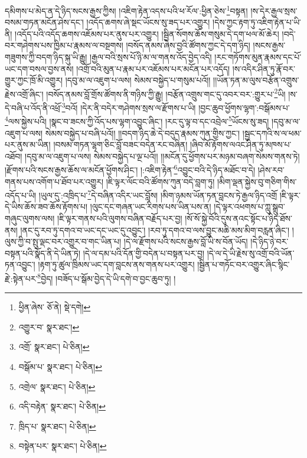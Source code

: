 དམིགས་པ་མེད་ན་དེ་ཉིད་སངས་རྒྱས་ཀྱིས། །འཇིག་རྟེན་འདས་པའི་ཕ་རོལ་:ཕྱིན་ཅེས་\footnote{ཕྱིན་ཞེས་  ཅོ་ནེ།  སྡེ་དགེ། }བསྟན། །ས་དེར་རྒྱལ་སྲས་བསམ་གཏན་མངོན་ཤེས་དང་། །འདོད་ཆགས་ཞེ་སྡང་ཡོངས་སུ་ཟད་པར་འགྱུར། །དེས་ཀྱང་རྟག་ཏུ་འཇིག་རྟེན་པ་ཡི་ནི། །འདོད་པའི་འདོད་ཆགས་འཇོམས་པར་ནུས་པར་འགྱུར། །སྦྱིན་སོགས་ཆོས་གསུམ་དེ་དག་ཕལ་མོ་ཆེར། །བདེ་བར་གཤེགས་པས་ཁྱིམ་པ་རྣམས་ལ་བསྔགས། །བསོད་ནམས་ཞེས་བྱའི་ཚོགས་ཀྱང་དེ་དག་ཉིད། །སངས་རྒྱས་གཟུགས་ཀྱི་བདག་ཉིད་སྐུ་ཡི་རྒྱུ། །རྒྱལ་བའི་སྲས་པོ་ཉི་མ་ལ་གནས་འོད་བྱེད་འདི། །རང་གཏོགས་མུན་རྣམས་དང་པོ་ཡང་དག་བསལ་བྱས་ནས། །འགྲོ་བའི་མུན་པ་རྣམ་པར་འཇོམས་པར་མངོན་པར་འདོད། །ས་འདིར་ཤིན་ཏུ་རྣོ་བར་གྱུར་ཀྱང་ཁྲོ་མི་འགྱུར། །དབུ་མ་ལ་འཇུག་པ་ལས། སེམས་བསྐྱེད་པ་གསུམ་པའོ།། །།ཡོན་ཏན་མ་ལུས་བརྩོན་འགྲུས་རྗེས་འགྲོ་ཞིང་། །བསོད་ནམས་བློ་གྲོས་ཚོགས་ནི་གཉིས་ཀྱི་རྒྱུ། །བརྩོན་འགྲུས་གང་དུ་འབར་བར་:གྱུར་པ་\footnote{འགྱུར་བ་  སྣར་ཐང་། }ཡི། །ས་དེ་བཞི་པ་འོད་ནི་འཕྲོ་\footnote{འགྲོ་  སྣར་ཐང་།  པེ་ཅིན། }བའོ། །དེར་ནི་བདེར་གཤེགས་སྲས་ལ་རྫོགས་པ་ཡི། །བྱང་ཆུབ་ཕྱོགས་ལྷག་:བསྒོམས་པ་\footnote{བསྒོམ་པ་  སྣར་ཐང་།  པེ་ཅིན། }ལས་སྐྱེས་པའི། །སྣང་བ་ཟངས་ཀྱི་འོད་པས་ལྷག་འབྱུང་ཞིང་། །རང་དུ་ལྟ་བ་དང་འབྲེལ་\footnote{འགྲེལ་  སྣར་ཐང་།  པེ་ཅིན། }ཡོངས་སུ་ཟད། །དབུ་མ་ལ་འཇུག་པ་ལས། སེམས་བསྐྱེད་པ་བཞི་པའོ།། །།བདག་ཉིད་ཆེ་དེ་བདུད་རྣམས་ཀུན་གྱིས་ཀྱང་། །སྦྱང་དཀའི་ས་ལ་ཕམ་པར་ནུས་མ་ཡིན། །བསམ་གཏན་ལྷག་ཅིང་བློ་བཟང་བདེན་རང་བཞིན། །ཞིབ་མོ་རྟོགས་ལའང་ཤིན་ཏུ་མཁས་པ་འཐོབ། །དབུ་མ་ལ་འཇུག་པ་ལས། སེམས་བསྐྱེད་པ་ལྔ་པའོ།། །།མངོན་དུ་ཕྱོགས་པར་མཉམ་བཞག་སེམས་གནས་ཏེ། །རྫོགས་པའི་སངས་རྒྱས་ཆོས་ལ་མངོན་ཕྱོགས་ཤིང་། །:འཇིག་རྟེན་\footnote{འདི་བརྟེན་  སྣར་ཐང་།  པེ་ཅིན། }འབྱུང་བའི་དེ་ཉིད་མཐོང་བ་དེ། །ཤེས་རབ་གནས་པས་འགོག་པ་ཐོབ་པར་འགྱུར། །ཇི་ལྟར་ལོང་བའི་ཚོགས་ཀུན་བདེ་བླག་ཏུ། །མིག་ལྡན་སྐྱེས་བུ་གཅིག་གིས་འདོད་པ་ཡི། །ཡུལ་དུ་:འཁྲིད་པ་\footnote{ཁྲིད་པ་  སྣར་ཐང་།  པེ་ཅིན། }དེ་བཞིན་འདིར་ཡང་བློས། །མིག་ཉམས་ཡོན་ཏན་བླངས་ཏེ་རྒྱལ་ཉིད་འགྲོ །ཇི་ལྟར་དེ་ཡིས་ཆོས་ཟབ་ཆོས་རྟོགས་པ། །ལུང་དང་གཞན་ཡང་རིགས་པས་ཡིན་པས་ན། །དེ་ལྟར་འཕགས་པ་ཀླུ་སྒྲུབ་གཞུང་ལུགས་ལས། །ཇི་ལྟར་གནས་པའི་ལུགས་བཞིན་བརྗོད་པར་བྱ། །སོ་སོ་སྐྱེ་བོའི་དུས་ནའང་སྟོང་པ་ཉིད་ཐོས་ནས། །ནང་དུ་རབ་ཏུ་དགའ་བ་ཡང་དང་ཡང་དུ་འབྱུང་། །རབ་ཏུ་དགའ་བ་ལས་བྱུང་མཆི་མས་མིག་བརླན་ཞིང་། །ལུས་ཀྱི་བ་སྤུ་ལྡང་བར་འགྱུར་བ་གང་ཡིན་པ། །དེ་ལ་རྫོགས་པའི་སངས་རྒྱས་བློ་ཡི་ས་བོན་ཡོད། །དེ་ཉིད་ཉེ་བར་བསྟན་པའི་སྣོད་ནི་དེ་ཡིན་ཏེ། །དེ་ལ་དམ་པའི་དོན་གྱི་བདེན་པ་བསྟན་པར་བྱ། །དེ་ལ་དེ་ཡི་རྗེས་སུ་འགྲོ་བའི་ཡོན་ཏན་འབྱུང་། །རྟག་ཏུ་ཚུལ་ཁྲིམས་ཡང་དག་བླངས་ནས་གནས་པར་འགྱུར། །སྦྱིན་པ་གཏོང་བར་འགྱུར་ཞིང་སྙིང་རྗེ་:སྟེན་པར་\footnote{བསྟེན་པར་  སྣར་ཐང་།  པེ་ཅིན། }བྱེད། །བཟོད་པ་སྒོམ་བྱེད་དེ་ཡི་དགེ་བ་བྱང་ཆུབ་ཏུ། །

